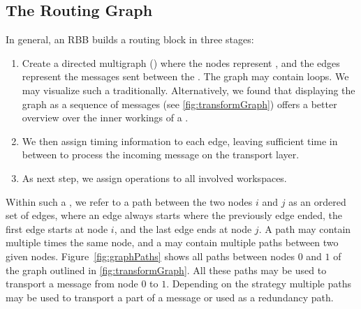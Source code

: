 \subsection{The Routing Graph}\label{sec:routingGraph}
In general, an RBB builds a routing block in three stages:
\begin{enumerate}
	\item Create a directed multigraph () where the nodes represent \VortexNodes, and the edges represent the messages sent between the \VortexNodes. The graph may contain loops. We may visualize such a  traditionally. Alternatively, we found that displaying the graph as a sequence of messages (see \cref{fig:transformGraph}) offers a better overview over the inner workings of a .
	\item We then assign timing information to each edge, leaving sufficient time in between to process the incoming message on the transport layer.
	\item As next step, we assign operations to all involved workspaces.
\end{enumerate}

Within such a , we refer to a path between the two nodes $i$ and $j$ as an ordered set of edges, where an edge always starts where the previously edge ended, the first edge starts at node $i$, and the last edge ends at node $j$. A path may contain multiple times the same node, and a  may contain multiple paths between two given nodes.  Figure~\ref{fig:graphPaths} shows all paths between nodes $0$ and $1$ of the graph outlined in \cref{fig:transformGraph}. All these paths may be used to transport a message from node $0$ to $1$. Depending on the strategy multiple paths may be used to transport a part of a message or used as a redundancy path.

